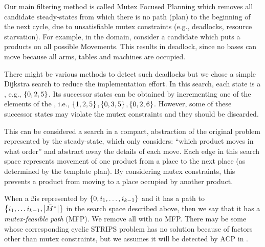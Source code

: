 Our main filtering method is called Mutex Focused Planning which
removes all candidate steady-states from which there is no path (plan) to the beginning of the next cycle, due to 
unsatisfiable mutex constraints (e.g., deadlocks, resource starvation).
For example, in the \ca domain, consider a candidate \msss
which puts a products on all possible Movements.
This results in deadlock, since no bases can move because all arms, tables and machines
are occupied.

There might be various methods to detect such deadlocks
but we chose a simple Dijkstra search to reduce the implementation effort.
In this search, each state is a \msss, e.g., $\left\{0,2,5\right\}$.
Its successor states can be obtained by
incrementing one of the elements of the \msss, i.e., 
$\left\{1,2,5\right\},\left\{0,3,5\right\},\left\{0,2,6\right\}$.
However, some of these successor states may violate the mutex constraints
and they should be discarded.

This can be considered a search in a compact, abstraction of the original problem represented by the steady-state, 
which only considers:
``which product moves in what order''
and abstract away the details of each move.
Each edge in this search space represents movement of one product
from a place to the next place (as determined by the template plan).
By considering mutex constraints, this prevents
a product from moving to a place occupied by another product.

When a \ss is represented by \msss $\left\{0,i_1,\ldots,i_{k-1}\right\}$
and it has a path to $\left\{i_1,\ldots i_{k-1},\left|\bar{M}^*\right|\right\}$
in the search space described above, 
then we say that it has a {\em mutex-feasible path} (MFP).
%
We remove all \sss with no MFP.
There may be some \sss whose corresponding cyclic STRIPS problem has no
solution because of factors other than mutex constraints, but we
assumes it will be detected by ACP in .

